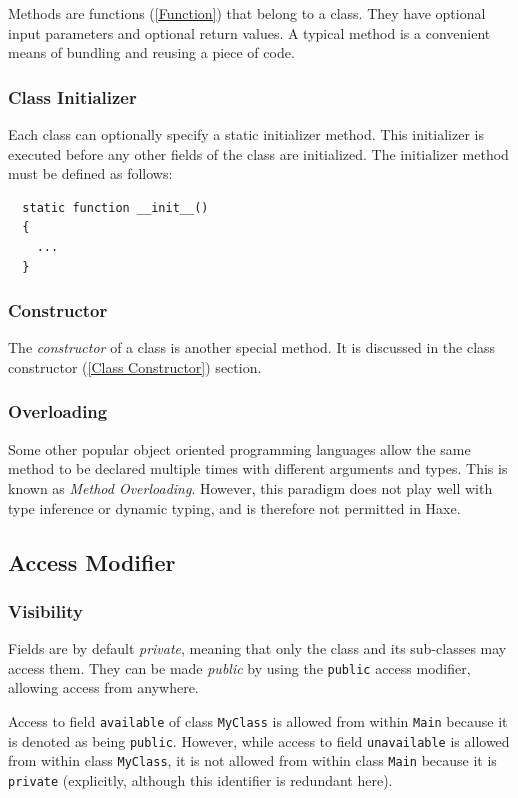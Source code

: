 \documentclass{article}
\newcommand{\type}[1]{\texttt{#1}}
\newcommand{\expr}[1]{\texttt{#1}}
\newcommand{\tref}[2]{#1 (\ref{#2})}
\newcommand{\haxe}[2][]{%
}
\begin{document}
Methods are \tref{functions}{Function} that belong to a class.  They have optional input parameters and optional return values.  A typical method is a convenient means of bundling and reusing a piece of code.

\subsubsection{Class Initializer}
\label{Class Initializer}
Each class can optionally specify a static initializer method.  This initializer is executed before any other fields of the class are initialized.  The initializer method must be defined as follows:
\begin{lstlisting}
  static function __init__()
  {
    ...
  }
\end{lstlisting}

\subsubsection{Constructor}
The \emph{constructor} of a class is another special method.  It is discussed in the \tref{class constructor}{Class Constructor} section.

\subsubsection{Overloading}
\label{Method Overloading}
Some other popular object oriented programming languages allow the same method to be declared multiple times with different arguments and types.  This is known as \emph{Method Overloading}.  However, this paradigm does not play well with type inference or dynamic typing, and is therefore not permitted in Haxe.

\subsection{Access Modifier}
\label{Access Modifier}

\subsubsection{Visibility}
\label{Visibility}
Fields are by default \emph{private}, meaning that only the class and its sub-classes may access them. They can be made \emph{public} by using the \expr{public} access modifier, allowing access from anywhere.

\haxe{assets/Visibility.hx}

Access to field \expr{available} of class \type{MyClass} is allowed from within \type{Main} because it is denoted as being \expr{public}. However, while access to field \expr{unavailable} is allowed from within class \type{MyClass}, it is not allowed from within class \type{Main} because it is \expr{private} (explicitly, although this identifier is redundant here).
\end{document}

